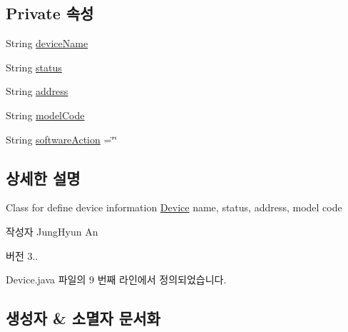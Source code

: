 \subsection*{Private 속성}
\begin{DoxyCompactItemize}
\item 
String \mbox{\hyperlink{classcom_1_1github_1_1aites_1_1framework_1_1orchestration_1_1_device_aa4746e20c5c8b51170b4ada37295f69e}{device\+Name}}
\item 
String \mbox{\hyperlink{classcom_1_1github_1_1aites_1_1framework_1_1orchestration_1_1_device_abe5c31f96d08c3caf2085af43d59cf6f}{status}}
\item 
String \mbox{\hyperlink{classcom_1_1github_1_1aites_1_1framework_1_1orchestration_1_1_device_a81329ac5d638ae2e569595efd92a4fe4}{address}}
\item 
String \mbox{\hyperlink{classcom_1_1github_1_1aites_1_1framework_1_1orchestration_1_1_device_ad40a301c336d5b74572d497eff8c90eb}{model\+Code}}
\item 
String \mbox{\hyperlink{classcom_1_1github_1_1aites_1_1framework_1_1orchestration_1_1_device_a0e90e3fc258c236228d8789722bdf3bb}{software\+Action}} =\char`\"{}\char`\"{}
\end{DoxyCompactItemize}


\subsection{상세한 설명}
Class for define device information \mbox{\hyperlink{classcom_1_1github_1_1aites_1_1framework_1_1orchestration_1_1_device}{Device}} name, status, address, model code 

\begin{DoxyAuthor}{작성자}
Jung\+Hyun An 
\end{DoxyAuthor}
\begin{DoxyVersion}{버전}
3.. 
\end{DoxyVersion}


Device.\+java 파일의 9 번째 라인에서 정의되었습니다.



\subsection{생성자 \& 소멸자 문서화}
\mbox{\label{classcom_1_1github_1_1aites_1_1framework_1_1orchestration_1_1_device_a0a208f31f2b1682d8f6c296d748dbb96}} 
